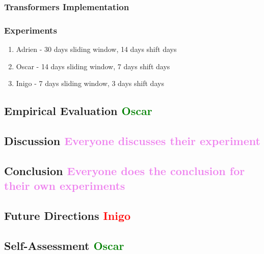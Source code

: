 \documentclass[12pt, letterpaper]{article}
\begin{document}
\subsubsection*{Transformers Implementation}

\subsubsection*{Experiments}
    \begin{enumerate}
        \item Adrien - 30 days sliding window, 14 days shift days
        \item Oscar - 14 days sliding window, 7 days shift days
        \item Inigo - 7 days sliding window, 3 days shift days
    \end{enumerate}
\subsection*{Empirical Evaluation \textcolor{green}{Oscar}}
\subsection*{Discussion \textcolor{violet}{Everyone discusses their experiment}}
\subsection*{Conclusion \textcolor{violet}{Everyone does the conclusion for their own experiments}}
\subsection*{Future Directions \textcolor{red}{Inigo}}
\subsection*{Self-Assessment \textcolor{green}{Oscar}}
\end{document}
